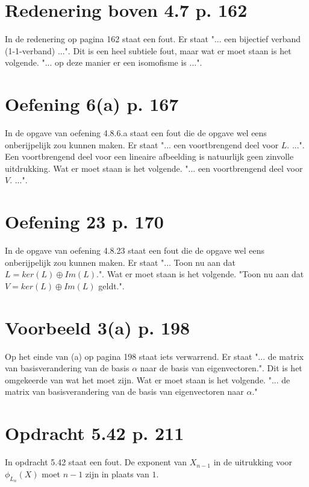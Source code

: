 \documentclass[lineaire_algebra_oplossingen.tex]{subfiles}
\begin{document}
\section{Redenering boven 4.7 p. 162}
In de redenering op pagina 162 staat een fout. Er staat "... een bijectief verband (1-1-verband) ...".
Dit is een heel subtiele fout, maar wat er moet staan is het volgende. "... op deze manier er een isomofisme is ...". 

\section{Oefening 6(a) p. 167}
In de opgave van oefening 4.8.6.a staat een fout die de opgave wel eens onberijpelijk zou kunnen maken.
Er staat "... een voortbrengend deel voor $L$. ...".
Een voortbrengend deel voor een lineaire afbeelding is natuurlijk geen zinvolle uitdrukking.
Wat er moet staan is het volgende. "... een voortbrengend deel voor $V$. ...".

\section{Oefening 23 p. 170}
In de opgave van oefening 4.8.23 staat een fout die de opgave wel eens onberijpelijk zou kunnen maken.
Er staat "... Toon nu aan dat $L = ker(L) \oplus Im(L)$.".
Wat er moet staan is het volgende.
"Toon nu aan dat $V = ker(L) \oplus Im(L)$ geldt.".

\section{Voorbeeld 3(a) p. 198}
Op het einde van (a) op pagina 198 staat iets verwarrend.
Er staat "... de matrix van basisverandering van de basis $\alpha$ naar de basis van eigenvectoren.".
Dit is het omgekeerde van wat het moet zijn.
Wat er moet staan is het volgende.
"... de matrix van basisverandering van de basis van eigenvectoren naar $\alpha$."

\section{Opdracht 5.42 p. 211}
In opdracht 5.42 staat een fout. De exponent van $X_{n-1}$ in de uitrukking voor $\phi_{L_{n}}(X)$ moet $n-1$ zijn in plaats van $1$.
\end{document}
